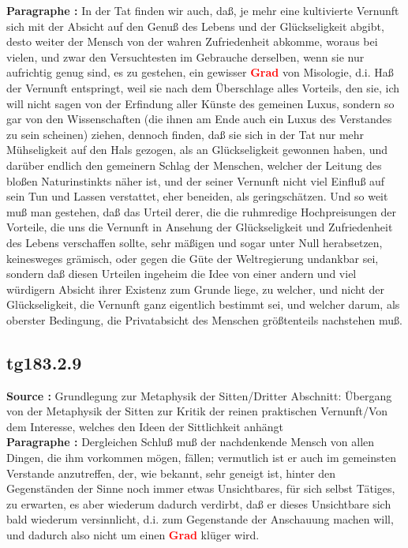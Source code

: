 \documentclass[a4paper,12pt,twoside]{book}
\newcommand{\match}[1]{\textcolor{red}{\textbf{#1}}}
\begin{document}
	\textbf{Paragraphe : }In der Tat finden wir auch, daß, je mehr eine kultivierte Vernunft sich mit der Absicht auf den Genuß des Lebens  und der Glückseligkeit abgibt, desto weiter der Mensch von der wahren Zufriedenheit abkomme, woraus bei vielen, und zwar den Versuchtesten im Gebrauche derselben, wenn sie nur aufrichtig genug sind, es zu gestehen, ein gewisser \match{Grad} von Misologie, d.i. Haß der Vernunft entspringt, weil sie nach dem Überschlage alles Vorteils, den sie, ich will nicht sagen von der Erfindung aller Künste des gemeinen Luxus, sondern so gar von den Wissenschaften (die ihnen am Ende auch ein Luxus des Verstandes zu sein scheinen) ziehen, dennoch finden, daß sie sich in der Tat nur mehr Mühseligkeit auf den Hals gezogen, als an Glückseligkeit gewonnen haben, und darüber endlich den gemeinern Schlag der Menschen, welcher der Leitung des bloßen Naturinstinkts näher ist, und der seiner Vernunft nicht viel Einfluß auf sein Tun und Lassen verstattet, eher beneiden, als geringschätzen. Und so weit muß man gestehen, daß das Urteil derer, die die ruhmredige Hochpreisungen der Vorteile, die uns die Vernunft in Ansehung der Glückseligkeit und Zufriedenheit des Lebens verschaffen sollte, sehr mäßigen und sogar unter Null herabsetzen, keinesweges grämisch, oder gegen die Güte der Weltregierung undankbar sei, sondern daß diesen Urteilen ingeheim die Idee von einer andern und viel würdigern Absicht ihrer Existenz zum Grunde liege, zu welcher, und nicht der Glückseligkeit, die Vernunft ganz eigentlich bestimmt sei, und welcher darum, als oberster Bedingung, die Privatabsicht des Menschen größtenteils nachstehen muß. 
	
	\subsection*{tg183.2.9} 
	\textbf{Source : }Grundlegung zur Metaphysik der Sitten/Dritter Abschnitt: Übergang von der Metaphysik der Sitten zur Kritik der reinen praktischen Vernunft/Von dem Interesse, welches den Ideen der Sittlichkeit anhängt\\  
	
	\textbf{Paragraphe : }Dergleichen Schluß muß der nachdenkende Mensch von allen Dingen, die ihm vorkommen mögen, fällen; vermutlich ist er auch im gemeinsten Verstande anzutreffen, der, wie bekannt, sehr geneigt ist, hinter den Gegenständen der Sinne noch immer etwas Unsichtbares, für sich selbst Tätiges, zu erwarten, es aber wiederum dadurch verdirbt, daß er dieses Unsichtbare sich bald wiederum versinnlicht, d.i. zum Gegenstande der Anschauung machen will, und dadurch also nicht um einen \match{Grad} klüger wird. 
	
\end{document}
